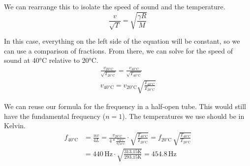 \documentclass[12pt]{article}
\begin{document}
            We can rearrange this to isolate the speed of sound and the temperature.
            \begin{equation}
                \frac{v}{\sqrt{T}} = \sqrt{\frac{\gamma R}{M}}
            \end{equation}

            In this case, everything on the left side of the equation will be constant, so we can use a comparison of fractions.
            From there, we can solve for the speed of sound at 40\unit{\celsius} relative to 20\unit{\celsius}.
            \begin{gather}
                \frac{v_{20\unit{\celsius}}}{\sqrt{T_{20\unit{\celsius}}}} = \frac{v_{40\unit{\celsius}}}{\sqrt{T_{40\unit{\celsius}}}}\\
                v_{40\unit{\celsius}}   =   v_{20\unit{\celsius}}\sqrt{\frac{T_{40\unit{\celsius}}}{T_{20\unit{\celsius}}}}
            \end{gather}

            We can reuse our formula for the frequency in a half-open tube.
            This would still have the fundamental frequency ($n = 1$).
            The temperatures we use should be in Kelvin.
            \begin{align}
                f_{40\unit{\celsius}}   &=  \frac{nv}{4L}
                    =   \frac{v_{20\unit{\celsius}}}{4*\frac{v_{20\unit{\celsius}}}{4f_{20\unit{\celsius}}}} \cdot \sqrt{\frac{T_{40\unit{\celsius}}}{T_{20\unit{\celsius}}}}
                    =   f_{20\unit{\celsius}}\,\sqrt{\frac{T_{40\unit{\celsius}}}{T_{20\unit{\celsius}}}}\\
                    &=  440\,\unit{\hertz} \cdot \sqrt{\frac{313.15\unit{\kelvin}}{293.15\unit{\kelvin}}}
                    =   \boxed{454.8\,\unit{\hertz}}
            \end{align}
\end{document}
